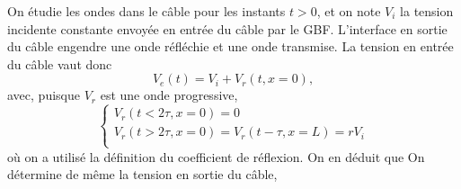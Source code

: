 \begin{quest}
  {
    On étudie les ondes dans le câble pour les instants $t>0$, et on note $V_i$ la tension incidente constante envoyée en entrée du câble par le GBF.  L’interface en sortie du câble engendre une onde réfléchie et une onde transmise. La tension en entrée du câble vaut donc 
    $$
    V_e(t) = V_i + V_r(t,x=0),
    $$
    avec, puisque $V_r$ est une onde progressive,
    $$
    \left\{
      \begin{array}{ll}
        V_r(t<2\tau,x=0) = 0 \\
        V_r(t>2\tau,x=0) = V_r(t-\tau,x=L) = r V_i\\
      \end{array}
    \right.
    $$
    où on a utilisé la définition du coefficient de réflexion. On en déduit que 
    On détermine de même la tension en sortie du câble,
  }
\end{quest}

